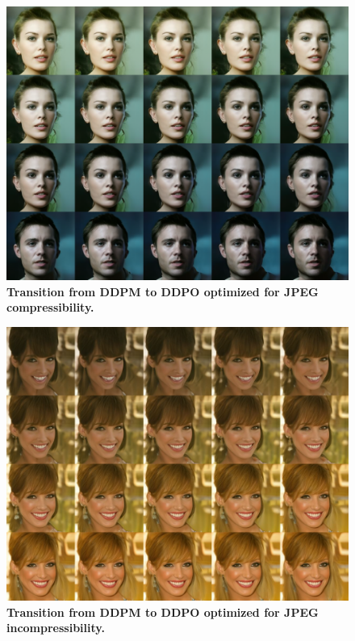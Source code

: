 \begin{figure}[ht]
  \centering
  \includegraphics[scale=1.40]{img/results/compressibility_6.png}
  \vspace{-0pt}  %
    \captionsetup{width=\textwidth} %
    \caption{\textbf{Transition from DDPM to DDPO optimized for JPEG compressibility.}}
    \label{fig:ddpm-to-ddpo-compressibility}
\end{figure}

\begin{figure}[ht]
  \centering
  \includegraphics[scale=1.40]{img/results/incompressibility_26.png}
  \vspace{-0pt}  %
    \captionsetup{width=\textwidth} %
    \caption{\textbf{Transition from DDPM to DDPO optimized for JPEG incompressibility.}}
    \label{fig:ddpm-to-ddpo-incompressibility}
\end{figure}


